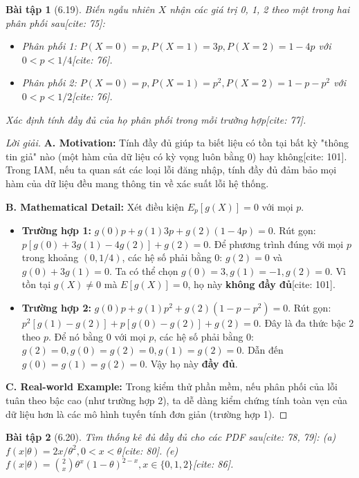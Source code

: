 \documentclass[8pt,a4paper]{article}
\newtheorem{exercise}{Bài tập}
\newenvironment{solution}{\begin{proof}[Lời giải]}{\end{proof}}
\begin{document}

\begin{exercise}[6.19]
Biến ngẫu nhiên $X$ nhận các giá trị 0, 1, 2 theo một trong hai phân phối sau[cite: 75]:
\begin{itemize}
    \item Phân phối 1: $P(X=0)=p, P(X=1)=3p, P(X=2)=1-4p$ với $0 < p < 1/4$[cite: 76].
    \item Phân phối 2: $P(X=0)=p, P(X=1)=p^2, P(X=2)=1-p-p^2$ với $0 < p < 1/2$[cite: 76].
\end{itemize}
Xác định tính đầy đủ của họ phân phối trong mỗi trường hợp[cite: 77].
\end{exercise}

\begin{solution}
\textbf{A. Motivation:} Tính đầy đủ giúp ta biết liệu có tồn tại bất kỳ "thông tin giả" nào (một hàm của dữ liệu có kỳ vọng luôn bằng 0) hay không[cite: 101]. Trong IAM, nếu ta quan sát các loại lỗi đăng nhập, tính đầy đủ đảm bảo mọi hàm của dữ liệu đều mang thông tin về xác suất lỗi hệ thống.

\textbf{B. Mathematical Detail:}
Xét điều kiện $E_p[g(X)] = 0$ với mọi $p$.
\begin{itemize}
    \item \textbf{Trường hợp 1:} $g(0)p + g(1)3p + g(2)(1-4p) = 0$.
    Rút gọn: $p[g(0) + 3g(1) - 4g(2)] + g(2) = 0$.
    Để phương trình đúng với mọi $p$ trong khoảng $(0, 1/4)$, các hệ số phải bằng 0: $g(2) = 0$ và $g(0) + 3g(1) = 0$.
    Ta có thể chọn $g(0)=3, g(1)=-1, g(2)=0$. Vì tồn tại $g(X) \neq 0$ mà $E[g(X)]=0$, họ này \textbf{không đầy đủ}[cite: 101].
    \item \textbf{Trường hợp 2:} $g(0)p + g(1)p^2 + g(2)(1-p-p^2) = 0$.
    Rút gọn: $p^2[g(1)-g(2)] + p[g(0)-g(2)] + g(2) = 0$.
    Đây là đa thức bậc 2 theo $p$. Để nó bằng 0 với mọi $p$, các hệ số phải bằng 0: $g(2)=0, g(0)=g(2)=0, g(1)=g(2)=0$.
    Dẫn đến $g(0)=g(1)=g(2)=0$. Vậy họ này \textbf{đầy đủ}.
\end{itemize}

\textbf{C. Real-world Example:} Trong kiểm thử phần mềm, nếu phân phối của lỗi tuân theo bậc cao (như trường hợp 2), ta dễ dàng kiểm chứng tính toàn vẹn của dữ liệu hơn là các mô hình tuyến tính đơn giản (trường hợp 1).
\end{solution}

\begin{exercise}[6.20]
Tìm thống kê đủ đầy đủ cho các PDF sau[cite: 78, 79]:
(a) $f(x|\theta) = 2x/\theta^2, 0 < x < \theta$[cite: 80].
(e) $f(x|\theta) = \binom{2}{x}\theta^x(1-\theta)^{2-x}, x \in \{0, 1, 2\}$[cite: 86].
\end{exercise}
\end{document}
